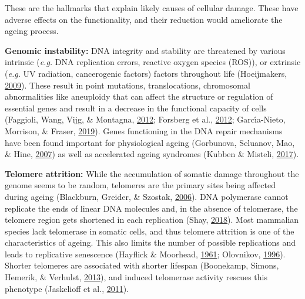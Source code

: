 \documentclass[12pt,twoside]{unicam}
\begin{document}
These are the hallmarks that explain likely causes of cellular damage. These have adverse effects on the functionality, and their reduction would ameliorate the ageing process.

\textbf{Genomic instability:} DNA integrity and stability are threatened by various intrinsic (\emph{e.g.} DNA replication errors, reactive oxygen species (ROS)), or extrinsic (\emph{e.g.} UV radiation, cancerogenic factors) factors throughout life (Hoeijmakers, \protect\hyperlink{ref-Hoeijmakers2009}{2009}). These result in point mutations, translocations, chromosomal abnormalities like aneuploidy that can affect the structure or regulation of essential genes and result in a decrease in the functional capacity of cells (Faggioli, Wang, Vijg, \& Montagna, \protect\hyperlink{ref-Faggioli2012}{2012}; Forsberg et al., \protect\hyperlink{ref-Forsberg2012}{2012}; Garcı́a-Nieto, Morrison, \& Fraser, \protect\hyperlink{ref-Garcia-Nieto2019}{2019}). Genes functioning in the DNA repair mechanisms have been found important for physiological ageing (Gorbunova, Seluanov, Mao, \& Hine, \protect\hyperlink{ref-Gorbunova2007}{2007}) as well as accelerated ageing syndromes (Kubben \& Misteli, \protect\hyperlink{ref-Kubben2017}{2017}).

\textbf{Telomere attrition:} While the accumulation of somatic damage throughout the genome seems to be random, telomeres are the primary sites being affected during ageing (Blackburn, Greider, \& Szostak, \protect\hyperlink{ref-Blackburn2006}{2006}). DNA polymerase cannot replicate the ends of linear DNA molecules and, in the absence of telomerase, the telomere region gets shortened in each replication (Shay, \protect\hyperlink{ref-Shay2018}{2018}). Most mammalian species lack telomerase in somatic cells, and thus telomere attrition is one of the characteristics of ageing. This also limits the number of possible replications and leads to replicative senescence (Hayflick \& Moorhead, \protect\hyperlink{ref-Hayflick1961}{1961}; Olovnikov, \protect\hyperlink{ref-Olovnikov1996}{1996}). Shorter telomeres are associated with shorter lifespan (Boonekamp, Simons, Hemerik, \& Verhulst, \protect\hyperlink{ref-Boonekamp2013}{2013}), and induced telomerase activity rescues this phenotype (Jaskelioff et al., \protect\hyperlink{ref-Jaskelioff2011}{2011}).
\end{document}
